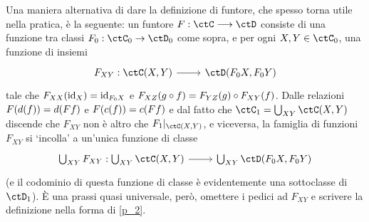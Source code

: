 \begin{remark}\label{def_alternativa_funtore}
	Una maniera alternativa di dare la definizione di funtore, che spesso torna utile nella pratica, è la seguente: un funtore \(F : \ctC\fun\ctD\) consiste di una funzione tra classi \(F_0 : \ctC_0\to \ctD_0\) come sopra, e per ogni \(X,Y\in\ctC_0\), una funzione di insiemi
	\[\dmFun{F_{XY}}{\Hom{\ctC}(X,Y)}{\Hom{\ctD}(F_0X,F_0Y)}
	\]
	tale che \(F_{XX}(\mathrm{id}_X) = \mathrm{id}_{F_0X}\) e \(F_{XZ}(g\circ f) = F_{YZ}(g)\circ F_{XY}(f)\). Dalle relazioni \(F(d(f))=d(Ff)\) e \(F(c(f))=c(Ff)\) e dal fatto che \(\ctC_1 = \bigcup_{XY}\Hom{\ctC}(X,Y)\) discende che \(F_{XY}\) non è altro che \(F_1|_{\Hom{\ctC}(X,Y)}\), e viceversa, la famiglia di funzioni \(F_{XY}\) si `incolla' a un'unica funzione di classe
	\[\dmFun{\bigcup_{XY}F_{XY}}{\bigcup_{XY}\Hom{\ctC}(X,Y)}{\bigcup_{XY}\Hom{\ctD}(F_0X,F_0Y)}\]
	(e il codominio di questa funzione di classe è evidentemente una sottoclasse di \(\ctD_1\)). \`E una prassi quasi universale, però, omettere i pedici ad \(F_{XY}\) e scrivere la definizione nella forma di \ref{p_2}.
\end{remark}
